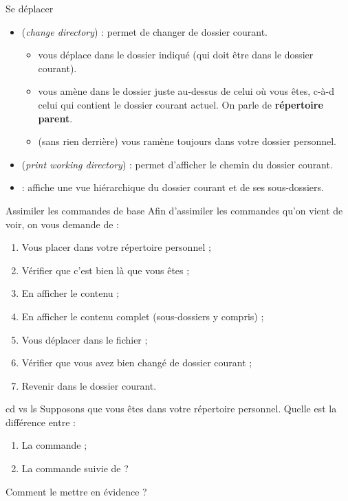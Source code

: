 \documentclass[a4paper,11pt]{style-esi/td}
\begin{document}
		\bigskip
		\begin{theorie}{Se déplacer}
			\begin{itemize}
			\item {} (\emph{change directory}) : permet de changer de dossier courant.
				\begin{itemize}
				\item {}
					vous déplace dans le dossier indiqué (qui doit être dans le dossier courant).
				\item {}
					vous amène dans le dossier juste au-dessus de celui où vous êtes, 
					c-à-d celui qui contient le dossier courant actuel.
					On parle de \textbf{répertoire parent}.
				\item {}
					(sans rien derrière) vous ramène toujours dans votre dossier personnel.
				\end{itemize}
			\item {} (\textit{print working directory})  :
				permet d'afficher le chemin du dossier courant.
			\item {} :
				affiche une vue hiérarchique du dossier courant et de ses sous-dossiers.
			\end{itemize}
		\end{theorie}

		\begin{Exercice}{Assimiler les commandes de base}
			Afin d'assimiler les commandes qu'on vient de voir,
			on vous demande de :
			\begin{enumerate}
				\item Vous placer dans votre répertoire personnel ;
				\item Vérifier que c'est bien là que vous êtes ;
				\item En afficher le contenu ;
				\item En afficher le contenu complet (sous-dossiers y compris) ;
				\item Vous déplacer dans le fichier  ;
				\item Vérifier que vous avez bien changé de dossier courant ;
				\item Revenir dans le dossier courant.
			\end{enumerate}
		\end{Exercice}

		\begin{Exercice}{cd vs ls}
			Supposons que vous êtes dans votre répertoire personnel.
			Quelle est la différence entre :
			\begin{enumerate}
				\item La commande  ;
				\item La commande  suivie de  ?
			\end{enumerate}
			Comment le mettre en évidence ?
		\end{Exercice}			
\end{document}
